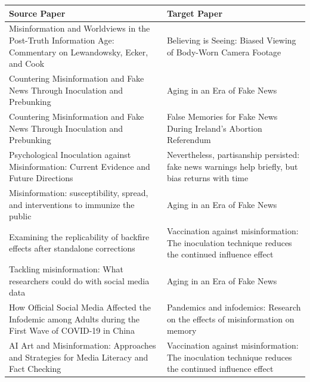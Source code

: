 \begin{tabular}{p{}p{}}
\toprule
Source Paper & Target Paper \\
\midrule
Misinformation and Worldviews in the Post-Truth Information Age: Commentary on Lewandowsky, Ecker, and Cook & Believing is Seeing: Biased Viewing of Body-Worn Camera Footage \\
Countering Misinformation and Fake News Through Inoculation and Prebunking & Aging in an Era of Fake News \\
Countering Misinformation and Fake News Through Inoculation and Prebunking & False Memories for Fake News During Ireland’s Abortion Referendum \\
Psychological Inoculation against Misinformation: Current Evidence and Future Directions & Nevertheless, partisanship persisted: fake news warnings help briefly, but bias returns with time \\
Misinformation: susceptibility, spread, and interventions to immunize the public & Aging in an Era of Fake News \\
Examining the replicability of backfire effects after standalone corrections & Vaccination against misinformation: The inoculation technique reduces the continued influence effect \\
Tackling misinformation: What researchers could do with social media data & Aging in an Era of Fake News \\
How Official Social Media Affected the Infodemic among Adults during the First Wave of COVID-19 in China & Pandemics and infodemics: Research on the effects of misinformation on memory \\
AI Art and Misinformation: Approaches and Strategies for Media Literacy and Fact Checking & Vaccination against misinformation: The inoculation technique reduces the continued influence effect \\
\bottomrule
\end{tabular}

